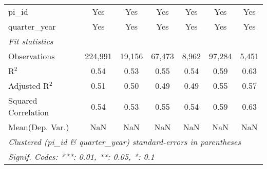 \begin{tabular}{lcccccc}
   pi\_id                                                     & Yes           & Yes           & Yes           & Yes           & Yes           & Yes\\  
   quarter\_year                                              & Yes           & Yes           & Yes           & Yes           & Yes           & Yes\\  
   \midrule
   \emph{Fit statistics}\\
   Observations                                               & 224,991       & 19,156        & 67,473        & 8,962         & 97,284        & 5,451\\  
   R$^2$                                                      & 0.54          & 0.53          & 0.55          & 0.54          & 0.59          & 0.63\\  
   Adjusted R$^2$                                             & 0.51          & 0.50          & 0.49          & 0.49          & 0.55          & 0.57\\  
   Squared Correlation                                        & 0.54          & 0.53          & 0.55          & 0.54          & 0.59          & 0.63\\  
Mean(Dep. Var.) & NaN & NaN & NaN & NaN & NaN & NaN \\
   \midrule \midrule
   \multicolumn{7}{l}{\emph{Clustered (pi\_id \& quarter\_year) standard-errors in parentheses}}\\
   \multicolumn{7}{l}{\emph{Signif. Codes: ***: 0.01, **: 0.05, *: 0.1}}\\
\end{tabular}
\par\endgroup
